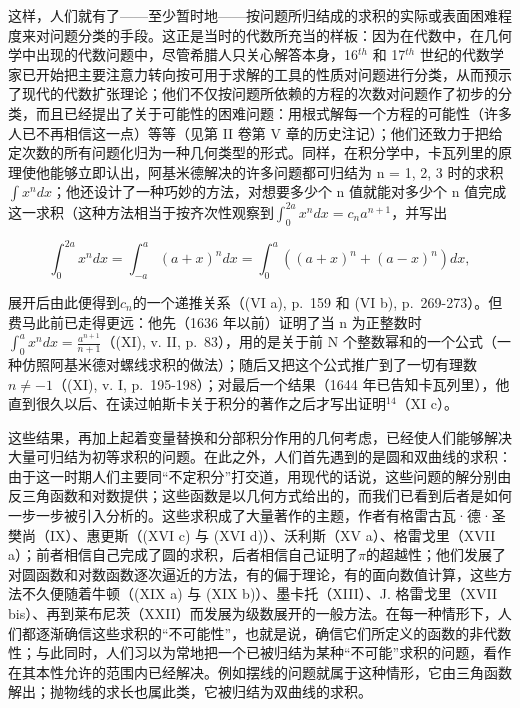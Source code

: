 这样，人们就有了——至少暂时地——按问题所归结成的求积的实际或表面困难程度来对问题分类的手段。这正是当时的代数所充当的样板：因为在代数中，在几何学中出现的代数问题中，尽管希腊人只关心解答本身，16\(^{th}\) 和 17\(^{th}\) 世纪的代数学家已开始把主要注意力转向按可用于求解的工具的性质对问题进行分类，从而预示了现代的代数扩张理论；他们不仅按问题所依赖的方程的次数对问题作了初步的分类，而且已经提出了关于可能性的困难问题：用根式解每一个方程的可能性（许多人已不再相信这一点）等等（见第 II 卷第 V 章的历史注记）；他们还致力于把给定次数的所有问题化归为一种几何类型的形式。同样，在积分学中，卡瓦列里的原理使他能够立即认出，阿基米德解决的许多问题都可归结为 n = 1, 2, 3 时的求积\(\int x^{n} dx\)；他还设计了一种巧妙的方法，对想要多少个 n 值就能对多少个 n 值完成这一求积（这种方法相当于按齐次性观察到\(\int_{0}^{2a} x^{n} dx = c_{n} a^{n+1}\)，并写出

\[
\int_ {0} ^ {2 a} x ^ {n} d x = \int_ {- a} ^ {a} (a + x) ^ {n} d x = \int_ {0} ^ {a} \left((a + x) ^ {n} + (a - x) ^ {n}\right) d x,
\]

展开后由此便得到\(c_{n}\)的一个递推关系（(VI a), p.~159 和 (VI b), p.~269-273）。但费马此前已走得更远：他先（1636 年以前）证明了当 n 为正整数时\(\int_{0}^{a} x^{n} dx = \frac{a^{n+1}}{n+1}\)（(XI), v. II, p.~83），用的是关于前 N 个整数幂和的一个公式（一种仿照阿基米德对螺线求积的做法）；随后又把这个公式推广到了一切有理数\(n \neq -1\)（(XI), v. I, p.~195-198）；对最后一个结果（1644 年已告知卡瓦列里），他直到很久以后、在读过帕斯卡关于积分的著作之后才写出证明\({}^{14}\)（XI c）。

这些结果，再加上起着变量替换和分部积分作用的几何考虑，已经使人们能够解决大量可归结为初等求积的问题。在此之外，人们首先遇到的是圆和双曲线的求积：由于这一时期人们主要同“不定积分”打交道，用现代的话说，这些问题的解分别由反三角函数和对数提供；这些函数是以几何方式给出的，而我们已看到后者是如何一步一步被引入分析的。这些求积成了大量著作的主题，作者有格雷古瓦·德·圣樊尚（IX）、惠更斯（(XVI c) 与 (XVI d)）、沃利斯（XV a）、格雷戈里（XVII a）；前者相信自己完成了圆的求积，后者相信自己证明了\(\pi\)的超越性；他们发展了对圆函数和对数函数逐次逼近的方法，有的偏于理论，有的面向数值计算，这些方法不久便随着牛顿（(XIX a) 与 (XIX b)）、墨卡托（XIII）、J. 格雷戈里（XVII bis）、再到莱布尼茨（XXII）而发展为级数展开的一般方法。在每一种情形下，人们都逐渐确信这些求积的“不可能性”，也就是说，确信它们所定义的函数的非代数性；与此同时，人们习以为常地把一个已被归结为某种“不可能”求积的问题，看作在其本性允许的范围内已经解决。例如摆线的问题就属于这种情形，它由三角函数解出；抛物线的求长也属此类，它被归结为双曲线的求积。

